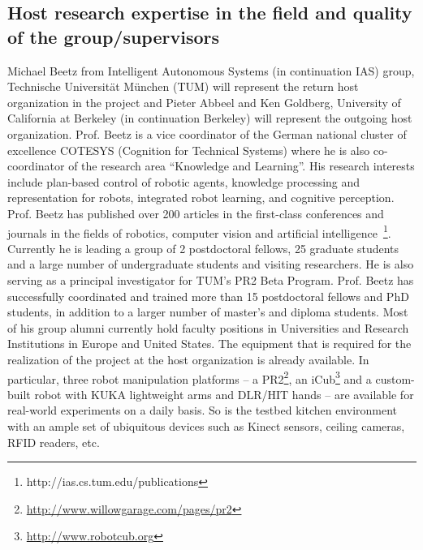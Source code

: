 \subsection{Host research expertise in the field and quality of the group/supervisors}
Michael Beetz from Intelligent Autonomous Systems (in continuation IAS) group, Technische Universit\"at 
M\"unchen (TUM) will represent the return host organization in the project and Pieter Abbeel and Ken
Goldberg, University of California at Berkeley (in continuation Berkeley) will represent
the outgoing host organization. 
Prof. Beetz is a vice coordinator of the German national cluster of excellence 
COTESYS (Cognition for Technical Systems) where he is also co-coordinator of the research area 
``Knowledge and Learning''. 
His research interests include plan-based control of 
robotic agents, knowledge processing and representation for robots, integrated robot learning, and cognitive perception.
Prof. Beetz has published over 200 articles in the first-class conferences and
journals in the fields of robotics, computer vision and artificial 
intelligence~\footnote{http://ias.cs.tum.edu/publications}.
Currently he is leading a group of 2 postdoctoral fellows, 25 graduate students and a large number
of undergraduate students and visiting researchers. He is also serving as a principal investigator 
for TUM's PR2 Beta Program. Prof. Beetz has successfully coordinated and trained 
more than 15 postdoctoral fellows and PhD students, in addition to a larger number of 
master's and diploma students. Most of his group alumni currently hold faculty positions in 
Universities and Research Institutions in Europe and United States.
The equipment that is required for the realization of the project at the host organization is already available. In
particular, three robot manipulation platforms -- a PR2\footnote{\url{http://www.willowgarage.com/pages/pr2}}, an
iCub\footnote{\url{http://www.robotcub.org}} and a custom-built robot
with KUKA lightweight arms and DLR/HIT hands -- are available for
real-world experiments on a daily basis. So is the testbed kitchen environment with an ample
set of ubiquitous devices such as Kinect sensors, ceiling cameras, RFID readers, etc.\\
